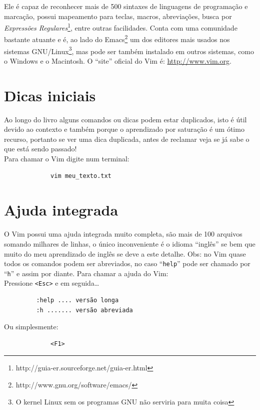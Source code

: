 \documentclass[10pt,a4paper,openany]{book}
\begin{document}
Ele é capaz de reconhecer mais de 500 sintaxes de linguagens de programação e
marcação, possui mapeamento para teclas, macros, abreviações, busca por
{\em{Expressões Regulares}}\footnote{http://guia-er.sourceforge.net/guia-er.html},
entre outras facilidades. Conta com uma comunidade bastante atuante e é, ao
lado do Emacs\footnote{http://www.gnu.org/software/emacs/} um dos editores mais
usados nos sistemas GNU/Linux\footnote{O kernel Linux sem os programas GNU não serviria para muita coisa},
mas pode ser também instalado em outros sistemas,
como o Windows e o Macintosh.  O ``site'' oficial do Vim é:
\url{http://www.vim.org}.


\section{Dicas iniciais}\label{Dicas iniciais}

Ao longo do livro alguns comandos ou dicas podem estar duplicados, isto
é útil devido ao contexto e também porque o aprendizado por saturação
é um ótimo recurso, portanto se ver uma dica duplicada, antes de
reclamar veja se já sabe o que está sendo passado! \\

Para chamar o Vim digite num terminal:

\begin{verbatim}
			 vim meu_texto.txt
\end{verbatim}

\section{Ajuda integrada}

O Vim possui uma ajuda integrada muito completa, são mais de 100 arquivos
somando milhares de linhas, o único inconveniente é o idioma ``inglês'' se bem
que muito do meu aprendizado de inglês se deve a este detalhe.
Obs: no Vim quase todos os comandos podem ser abreviados, no caso
``\verb+help+'' pode ser chamado por ``\verb+h+'' e assim por diante.
Para chamar a ajuda do Vim:  \\

Pressione \verb|<Esc>| e em seguida\dots

\begin{verbatim}
		 :help .... versão longa
		 :h ....... versão abreviada
\end{verbatim}

Ou simplesmente:

\begin{verbatim}
			 <F1>
\end{verbatim}
\end{document}
